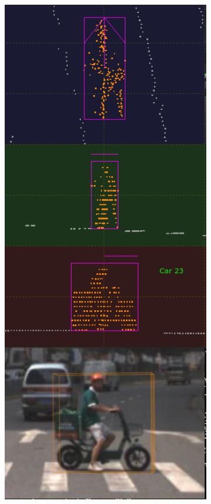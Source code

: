 \documentclass[letterpaper, 10 pt, conference]{ieeeconf}  %
\begin{document}
\begin{figure}[th]
\begin{subfigure}{0.16\linewidth}
		\includegraphics[scale=0.12]{./figures/transfer/rider-2}
		\caption{}
	\end{subfigure}
	~
	\begin{subfigure}{0.16\linewidth}

\end{subfigure}
\end{figure}
\end{document}
